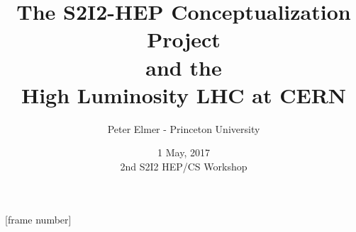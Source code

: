 \documentclass{beamer}
\title{The S2I2-HEP Conceptualization Project \\
       and the \\
       High Luminosity LHC at CERN}
\author{Peter Elmer - Princeton University}
\date{1 May, 2017 \\ 2nd S2I2 HEP/CS Workshop}
\begin{document}
\maketitle

%
%

[frame number]

%
%
%
%
%
%
%
%
%
%
%
%
%
%

%
%
%
%
%







%

%













%



%
%
%
%
\end{document}
